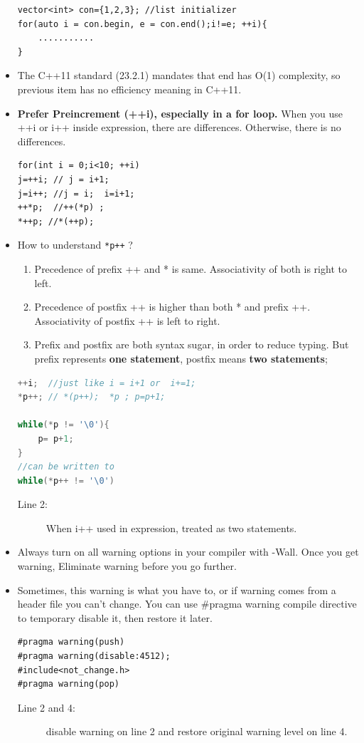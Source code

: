 \documentclass[a4paper,11pt,twoside]{book}
\begin{document}
\begin{itemize}
\begin{lstlisting}[numbers=none]
vector<int> con={1,2,3}; //list initializer
for(auto i = con.begin, e = con.end();i!=e; ++i){
	...........
}
\end{lstlisting}
	
	\item The C++11 standard (23.2.1) mandates that end has O(1) complexity, so previous item has no efficiency meaning in C++11.
	
	
	\item \textbf{Prefer Preincrement (++i), especially in a for loop.}  When you use ++i or i++ inside expression, there are differences. Otherwise, there is no differences.
	
\begin{lstlisting}[numbers=none]
for(int i = 0;i<10; ++i)
j=++i; // j = i+1;
j=i++; //j = i;  i=i+1;
++*p;  //++(*p) ;
*++p; //*(++p);
\end{lstlisting}
	
	\item How to understand \texttt{*p++} ?
	
	\begin{enumerate}
		\item Precedence of prefix ++ and * is same. Associativity of both is right to left.
		\item Precedence of postfix ++ is higher than both * and prefix ++. Associativity of postfix ++ is left to right.
		\item Prefix and postfix are both syntax sugar, in order to reduce typing.   But prefix represents \textbf{one statement}, postfix means \textbf{two statements};
	\end{enumerate}
	
\begin{lstlisting}[frame=single, language=c++]
++i;  //just like i = i+1 or  i+=1;
*p++; // *(p++);  *p ; p=p+1;

while(*p != '\0'){
	p= p+1;
}
//can be written to
while(*p++ != '\0')
\end{lstlisting}
\begin{description}
	\item[Line 2:] When i++ used in expression, treated as two statements.
\end{description}
	
	\item Always turn on all warning options in your compiler with -Wall. Once you get warning, Eliminate warning before you go further.
	
	\item Sometimes, this warning is what you have to, or if warning comes from a header file you can't change. You can use \#pragma warning compile directive to temporary disable it, then restore it later.
\begin{lstlisting}[numbers=none]
#pragma warning(push)
#pragma warning(disable:4512);
#include<not_change.h>
#pragma warning(pop)
\end{lstlisting}
\begin{description}
	\item[Line 2 and 4:] disable warning on line 2 and restore original warning level on line 4.
\end{description}
	
\end{itemize}


\end{document}
